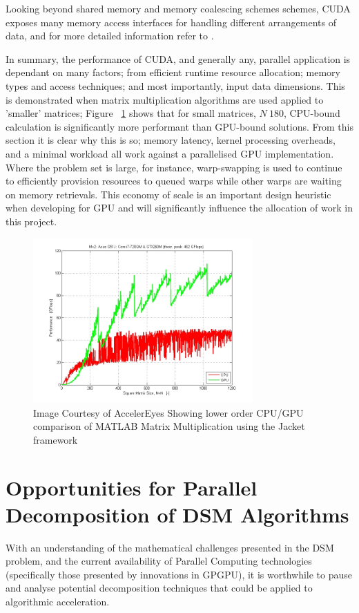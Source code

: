 Looking beyond shared memory and memory coalescing schemes schemes, CUDA exposes many memory access interfaces for handling different arrangements of data, and for more detailed information refer to \cite{NC11}.

In summary, the performance of CUDA, and generally any, parallel application is dependant on many factors; from efficient runtime resource allocation; memory types and access techniques; and most importantly, input data dimensions. This is demonstrated when matrix multiplication algorithms are used applied to 'smaller' matrices; Figure ~\ref{fig:CPU_GPU_MATMUL_SMALL} shows that for small matrices, \(N~180\), CPU-bound calculation is significantly more performant than GPU-bound solutions. From this section it is clear why this is so; memory latency, kernel processing overheads, and a minimal workload all work against a parallelised GPU implementation. Where the problem set is large, for instance, warp-swapping is used to continue to efficiently provision resources to queued warps while other warps are waiting on memory retrievals.
This economy of scale is an important design heuristic when developing for GPU and will significantly influence the allocation of work in this project.

\begin{figure}[h!]
\centering
    \includegraphics[width=0.75\textwidth,keepaspectratio=true]{images/FlopsMx2_Asus_G51J_02.png}
  \caption{Image Courtesy of AccelerEyes  Showing lower order CPU/GPU comparison of MATLAB Matrix Multiplication using the Jacket framework}
  \label{fig:CPU_GPU_MATMUL_SMALL}
\end{figure}

\section{Opportunities for Parallel Decomposition of DSM Algorithms}
With an understanding of the mathematical challenges presented in the DSM problem, and the current availability of Parallel Computing technologies (specifically those presented by innovations in GPGPU), it is worthwhile to pause and analyse potential decomposition techniques that could be applied to algorithmic acceleration.

